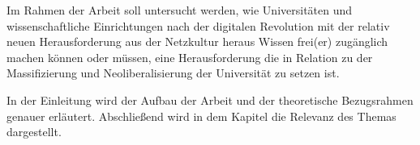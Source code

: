 Im Rahmen der Arbeit soll untersucht werden, wie Universitäten und wissenschaftliche Einrichtungen nach der digitalen Revolution mit der relativ neuen Herausforderung aus der Netzkultur heraus Wissen frei(er) zugänglich machen können oder müssen, eine Herausforderung die in Relation zu der Massifizierung und Neoliberalisierung der Universität zu setzen ist.

In der Einleitung wird der Aufbau der Arbeit und der theoretische Bezugsrahmen genauer erläutert. Abschließend wird in dem Kapitel die Relevanz des Themas dargestellt.
